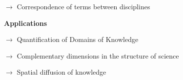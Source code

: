 {\medskip

$\rightarrow$ Correspondence of terms between disciplines

\bigskip
\bigskip





\textbf{Applications}

\medskip

$\rightarrow$ Quantification of Domains of Knowledge \cite{raimbault2017applied}

\medskip

$\rightarrow$ Complementary dimensions in the structure of science

\medskip

$\rightarrow$ Spatial diffusion of knowledge \cite{doi:10.1162isala00283} 




}








